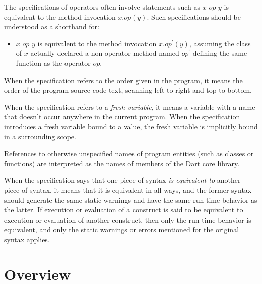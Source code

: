 \documentclass{article}
\begin{document}
\LMHash{}
The specifications of operators often involve statements such as $x$ $op$ $y$ is equivalent to the method invocation $x.op(y)$.
Such specifications should be understood as a shorthand for:
\begin{itemize}
\item
$x$ $op$ $y$ is equivalent to the method invocation $x.op^\prime(y)$, assuming the class of $x$ actually declared a non-operator method named $op^\prime$ defining the same function as the operator $op$.
\end{itemize}


\LMHash{}
When the specification refers to the order given in the program, it means the order of the program source code text, scanning left-to-right and top-to-bottom.

\LMHash{}
When the specification refers to a {\em fresh variable}, it means a variable with a name that doesn't occur anywhere in the current program.
When the specification introduces a fresh variable bound to a value, the fresh variable is implicitly bound in a surrounding scope.

\LMHash{}
References to otherwise unspecified names of program entities (such as classes or functions) are interpreted as the names of members of the Dart core library.


\LMHash{}
When the specification says that one piece of syntax {\em is equivalent to} another piece of syntax, it means that it is equivalent in all ways, and the former syntax should generate the same static warnings and have the same run-time behavior as the latter.
If execution or evaluation of a construct is said to be equivalent to execution or evaluation of another construct, then only the run-time behavior is equivalent, and only the static warnings or errors mentioned for the original syntax applies.


\section{Overview}
\end{document}

